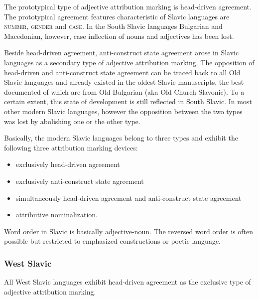 \noindent The prototypical type of adjective attribution marking is head-driven agreement. The prototypical agreement features characteristic of Slavic languages are \textsc{number}, \textsc{gender} and \textsc{case}. In the South Slavic languages Bulgarian and Macedonian, however, case inflection of nouns and adjectives has been lost.

Beside head-driven agreement, anti-construct state agreement arose in Slavic languages as a secondary type of adjective attribution marking. The opposition of head-driven and anti-construct state agreement can be traced back to all Old Slavic languages and already existed in the oldest Slavic manuscripts, the best documented of which are from Old Bulgarian (aka Old Church Slavonic). To a certain extent, this state of development is still reflected in South Slavic. In most other modern Slavic languages, however the opposition between the two types was lost by abolishing one or the other type.

Basically, the modern Slavic languages belong to three types and exhibit the following three attribution marking devices:
\begin{itemize}
\item{exclusively head-driven agreement}
\item{exclusively anti-construct state agreement}
\item{simultaneously head-driven agreement and anti-construct state agreement}
\item{attributive nominalization.}
\end{itemize}
Word order in Slavic is basically adjective-noun. The reversed word order is often possible but restricted to emphasized constructions or poetic language. 

\subsubsection{West Slavic}
All West Slavic languages exhibit head-driven agreement as the exclusive type of adjective attribution marking.

